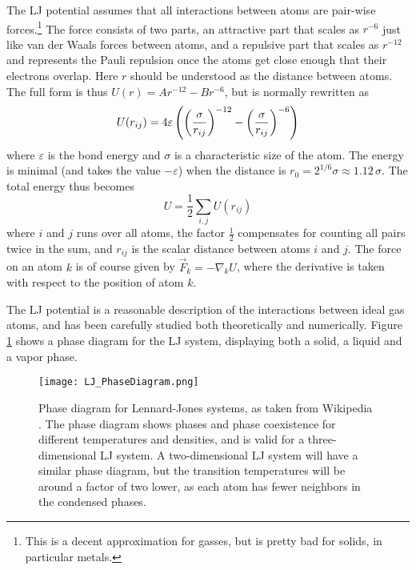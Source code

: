 \documentclass[a4paper,11pt]{article}
\begin{document}
The LJ potential assumes that all interactions between atoms are
pair-wise forces.\footnote{This is a decent approximation for gasses,
  but is pretty bad for solids, in particular metals.}
The force consists of two parts, an attractive part that scales as
$r^{-6}$ just like van der Waals forces between atoms, and a repulsive
part that scales as $r^{-12}$ and represents the Pauli repulsion once
the atoms get close enough that their electrons overlap.  Here $r$
should be understood as the distance between atoms. The full
form is thus $U(r) = A r^{-12} - B r^{-6}$, but is normally rewritten
as
\begin{equation}
  \label{eq:3}
  U(r_{ij}) = 4 \varepsilon \left( \left({\sigma \over r_{ij}}
    \right)^{-12} - \left({\sigma \over r_{ij}}
    \right)^{-6} \right)
\end{equation}
where $\varepsilon$ is the bond energy and $\sigma$ is a
characteristic size of the atom.  The energy is minimal (and takes the
value $-\varepsilon$) when the distance is $r_0 = 2^{1/6} \sigma
\approx 1.12 \,\sigma$.  The total energy thus becomes
\begin{equation}
  \label{eq:2}
  U = \frac12 \sum_{i,j} U(r_{ij})
\end{equation}
where $i$ and $j$ runs over all atoms, the factor $\frac12$
compensates for counting all pairs twice in the sum, and $r_{ij}$ is
the scalar distance between atoms $i$ and $j$.  The force on an atom
$k$ is of course given by $\vec F_k = - \nabla_k U$, where the
derivative is taken with respect to the position of atom $k$.

The LJ potential is a reasonable description of the interactions
between ideal gas atoms, and has been carefully studied both
theoretically and numerically.  Figure \ref{fig:phasediagram} shows a
phase diagram for the LJ system, displaying both a solid, a liquid and
a vapor phase.
\begin{figure}
  \centering
  \texttt{[image: LJ\_PhaseDiagram.png]}
  \caption{Phase diagram for Lennard-Jones systems, as taken from
    Wikipedia \cite{WikiPhase}.  The phase diagram shows phases and
    phase coexistence for different temperatures and densities, and is
    valid for a three-dimensional LJ system.  A two-dimensional LJ
    system will have a similar phase diagram, but the transition
    temperatures will be around a factor of two lower, as each atom
    has fewer neighbors in the condensed phases.}
  \label{fig:phasediagram}
\end{figure}
\end{document}
